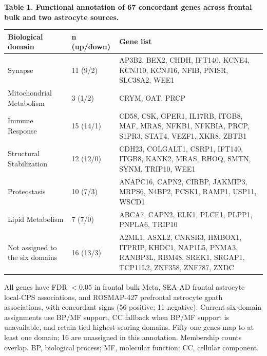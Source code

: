 \fontsize{10}{12}\selectfont
\textbf{Table 1. Functional annotation of 67 concordant genes across frontal bulk and two astrocyte sources.}\par\vspace{5pt}
\fontsize{8.6}{10.7}\selectfont
\begin{tabularx}{\linewidth}{|L{34mm}|C{20mm}|Y|}\hline
\textbf{Biological domain} & \textbf{n (up/down)} & \textbf{Gene list} \\ \hline
Synapse & 11 (9/2) & AP3B2, BEX2, CHDH, IFT140, KCNE4, KCNJ10, KCNJ16, NFIB, PNISR, SLC38A2, WEE1 \\ \hline
Mitochondrial Metabolism & 3 (1/2) & CRYM, OAT, PRCP \\ \hline
Immune Response & 15 (14/1) & CD58, CSK, GPER1, IL17RB, ITGB8, MAF, MRAS, NFKB1, NFKBIA, PRCP, S1PR3, STAT4, VEZF1, XKR8, ZBTB1 \\ \hline
Structural Stabilization & 12 (12/0) & CDH23, COLGALT1, CSRP1, IFT140, ITGB8, KANK2, MRAS, RHOQ, SMTN, SYNM, TRIP10, WEE1 \\ \hline
Proteostasis & 10 (7/3) & ANAPC16, CAPN2, CIRBP, JAKMIP3, MRPS6, N4BP2, PCSK1, RAMP1, USP11, WSCD1 \\ \hline
Lipid Metabolism & 7 (7/0) & ABCA7, CAPN2, ELK1, PLCE1, PLPP1, PNPLA6, TRIP10 \\ \hline
Not assigned to the six domains & 16 (13/3) & A2ML1, ASXL2, CNKSR3, HMBOX1, ITPRIP, KHDC1, NAP1L5, PNMA3, RANBP3L, RBM48, SREK1, SRGAP1, TCP11L2, ZNF358, ZNF787, ZXDC \\ \hline
\end{tabularx}\par\vspace{5pt}
\fontsize{8}{10}\selectfont
All genes have FDR $<0.05$ in frontal bulk Meta, SEA-AD frontal astrocyte local-CPS associations, and ROSMAP-427 prefrontal astrocyte gpath associations, with concordant signs (56 positive; 11 negative). 
Current six-domain assignments use BP/MF support, CC fallback when BP/MF support is unavailable, and retain tied highest-scoring domains. Fifty-one genes map to at least one domain; 16 are unassigned in this annotation. Membership counts overlap. 
BP, biological process; MF, molecular function; CC, cellular component.